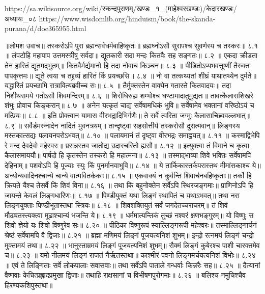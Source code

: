 https://sa.wikisource.org/wiki/स्कन्दपुराणम्/खण्डः_१_(माहेश्वरखण्डः)/केदारखण्डः/अध्यायः_०८
https://www.wisdomlib.org/hinduism/book/the-skanda-purana/d/doc365955.html

॥लोमश उवाच॥
तस्करोऽपि पुरा ब्रह्मन्सर्वधर्मबाहिष्कृतः॥
ब्रह्मघ्नोऽसौ सुरापश्च सुवर्णस्य च तस्करः॥ ८.१ ॥
लंपटोहि महापाप उत्तमस्त्रीषु सर्वदा॥
द्यूतकारी सदा मन्दः कितवैः सह सङ्गतः॥ ८.२ ॥
एकदा क्रीडता तेन हारितं द्यूतमद्भुतम्॥
कितवैर्मर्द्यमानो हि तदा नोवाच किञ्चन॥ ८.३ ॥
पीडितोऽप्यभवत्तूष्णीं तैरुक्तः पापकृत्तमः॥
द्यूते त्वया च तद्द्रव्यं हारितं किं प्रयच्छसि॥ ८.४ ॥
नो वा तत्कथ्यतां शीघ्रं याथातथ्येन दुर्मते॥
यद्धारितं प्रयच्छामि रात्रावित्यब्रवीच्च सः॥ ८.५ ॥
तैर्मुक्तस्तेन वाक्येन गतास्ते कितवादयः॥
तदा निशीथसमये गतोऽसौ शिवमन्दिरम्॥ ८.६ ॥
शिरोधिरुह्य शम्भोश्च घण्टामादातुमुद्यतः॥
तावत्कैलासशिखरे शंभुः प्रोवाच किङ्करान्॥ ८.७ ॥
अनेन यत्कृतं चाद्य सर्वेषामधिकं भुवि॥
सर्वेषामेव भक्तानां वरिष्ठोऽयं च मत्प्रियः॥ ८.८ ॥
इति प्रोक्त्वान यामास वीरभद्रादिभिर्गणैः॥
ते सर्वे त्वरिता जग्मुः कैलासाच्छिववल्लभात्॥ ८.९ ॥
सर्वैर्डमरुनादेन नादितं भुवनत्रयम्॥
तान्दृष्ट्वा सहसोत्तीर्य तस्करोसौ दुरात्मवान्॥
लिङ्गस्य मस्तकात्सद्यः पलायनपरोऽभवत्॥ ८.१० ॥
पलायमानं तं दृष्ट्वा वीरभद्रः समाह्वयत्॥ ८.११ ॥
कस्माद्विभेपि रे मन्द देवदेवो महेस्वरः॥
प्रसन्नस्तव जातोद्य उदारचरितो ह्यसौ॥ ८.१२ ॥
इत्युक्त्वा तं विमाने च कृत्वा कैलासमाययौ॥
पार्षदो हि कृतस्तेन तस्करो हि महात्मना॥ ८.१३ ॥
तस्माद्भाव्या शिवे भक्तिः सर्वेषामपि देहिनाम्॥
पशवोऽपि हि पूज्याः स्युः किं पुनर्मानवाभुवि॥ ८.१४ ॥
ये तार्किकास्तर्कपरास्तथ मीमांसकाश्च ये॥
अन्योन्यवादिनश्चान्ये चान्ये वात्मवितर्ककाः॥ ८.१५ ॥
एकवाक्यं न कुर्वन्ति शिवार्चनबहिष्कृताः॥
तर्को हि क्रियते यैश्च तेसर्वे किं शिवं विना॥ ८.१६ ॥
तथा किं बहुनोक्तेन सर्वेऽपि स्थिरजङ्गमाः॥
प्राणिनोऽपि हि जायन्ते केवलं लिङ्गधारिणः॥ ८.१७ ॥
पिण्डीयुक्तं यथा लिङ्गं स्थापितं च यथाऽभवत्॥
तथा नरा लिङ्गयुक्ताः पिण्डीभूतास्तथा स्त्रियः॥ ८.१८ ॥
शिवशक्तियुतं सर्वं जगदेतच्चराचरम्॥
तं शिवं मौढ्यतस्त्यक्त्वा मूढाश्चान्यं भजन्ति ये॥ ८.१९ ॥
धर्ममात्यन्तिकं तुच्छं नश्वरं क्षणभङ्गुरम्॥
यो विष्णुः स शिवो ज्ञेयो यः शिवो विष्णुरेव सः॥ ८.२० ॥
पीठिका विष्णुरूपं स्याल्लिङ्गरूपी महेश्वरः॥
तस्माल्लिङ्गार्चनं श्रेष्ठं सर्वेषामपि वै द्विजाः॥ ८.२१ ॥
ब्रह्मा मणिमयं लिङ्गं पूजयत्यनिशं शुभम्॥
इन्द्रो रत्नमयं लिङ्गं चन्द्रो मुक्तामयं तथा॥ ८.२२ ॥
भानुस्ताम्रमयं लिङ्गं पूजयत्यनिशं शुभम्॥
रौक्मं लिङ्गं कुबेरश्च पाशी चारक्तमेव च॥ ८.२३ ॥
यमो नीलमयं लिङ्गं राजतं नैर्ऋतस्तथा॥
काश्मीरं पवनो लिङ्गमर्चयत्यनिशं विभोः॥ ८.२४ ॥
एवं ते लिङ्गिताः सर्वे लोकपालाः सवासवाः॥
तथा सर्वेऽपि पाताले गन्धर्वाः किन्नरैः सह॥ ८.२५ ॥
दैत्यानां वैष्णवाः केचित्प्रह्लादप्रमुखा द्विजाः॥
तथाहि राक्षसानां च विभीषणपुरोगमाः॥ ८.२६ ॥
बलिश्च नमुचिश्चैव हिरण्यकशिपुस्तथा॥
